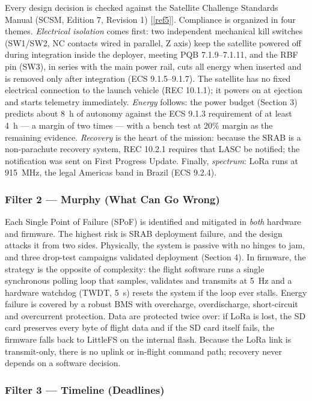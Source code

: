 Every design decision is checked against the Satellite Challenge
Standards Manual (SCSM, Edition 7, Revision 1) [\ref{ref5}]. Compliance is
organized in four themes. \emph{Electrical isolation} comes first: two
independent mechanical kill switches (SW1/SW2, NC contacts wired in
parallel, Z axis) keep the satellite powered off during integration inside the deployer, meeting
PQB 7.1.9--7.1.11, and the RBF pin (SW3), in series with the main power
rail, cuts all energy when inserted and is removed only after
integration (ECS 9.1.5--9.1.7). The satellite has no fixed electrical
connection to the launch vehicle (REC 10.1.1); it powers on at ejection
and starts telemetry immediately. \emph{Energy} follows: the power
budget (Section 3) predicts about 8~h of autonomy against the ECS 9.1.3
requirement of at least 4~h --- a margin of two times --- with
a bench test at 20\% margin as the remaining evidence.
\emph{Recovery} is the heart of the mission: because the SRAB is a
non-parachute recovery system, REC 10.2.1 requires that LASC be
notified; the notification was sent on First Progress Update.
Finally, \emph{spectrum}: LoRa runs at 915~MHz, the legal Americas
band in Brazil (ECS 9.2.4).

\subsubsection{Filter 2 — Murphy (What Can Go Wrong)}

Each Single Point of Failure (SPoF) is identified and mitigated in
\emph{both} hardware and firmware. The highest risk is SRAB deployment
failure, and the design attacks it from two sides. Physically, the
system is passive with no hinges to jam, and three drop-test campaigns
validated deployment (Section 4). In firmware, the strategy is the opposite of
complexity: the flight software runs a single synchronous polling loop
that samples, validates and transmits at 5~Hz and a hardware watchdog 
(TWDT, 5~s) resets the system if the loop ever stalls.
Energy failure is covered by a robust
BMS with overcharge, overdischarge, short-circuit and overcurrent
protection. Data are protected twice over: if LoRa is lost, 
the SD card preserves every byte of flight data and if the SD card itself fails,
the firmware falls back to LittleFS on the internal flash. Because the
LoRa link is transmit-only, there is no uplink or in-flight command
path; recovery never depends on a software decision.

\subsubsection{Filter 3 — Timeline (Deadlines)}

